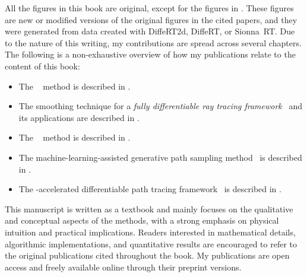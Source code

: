 \begin{refsection}
  All the figures in this book are original, except for the figures in . These figures are new or modified versions of the original figures in the cited papers, and they were generated from data created with DiffeRT2d, DiffeRT, or Sionna~RT. Due to the nature of this writing, my contributions are spread across several chapters. The following is a non-exhaustive overview of how my publications relate to the content of this book:
  {%
    \begin{itemize}
      \item The ~\cite{Eertmans2023EuCAP} method is described in .
      \item The smoothing technique for a \emph{fully differentiable ray tracing framework}~\cite{Eertmans2024EuCAP} and its applications are described in .
      \item The ~\cite{Eertmans2025EuCAP} method is described in .
      \item The machine-learning-assisted generative path sampling method~\cite{Eertmans2025ICMLCN,Eertmans2026NPJWT} is described in .
      \item The -accelerated differentiable path tracing framework~\cite{Eertmans2026EuCAP} is described in .
    \end{itemize}
  }

  This manuscript is written as a textbook and mainly focuses on the qualitative and conceptual aspects of the methods, with a strong emphasis on physical intuition and practical implications. Readers interested in mathematical details, algorithmic implementations, and quantitative results are encouraged to refer to the original publications cited throughout the book. My publications are open access and freely available online through their preprint versions.

\end{refsection}
